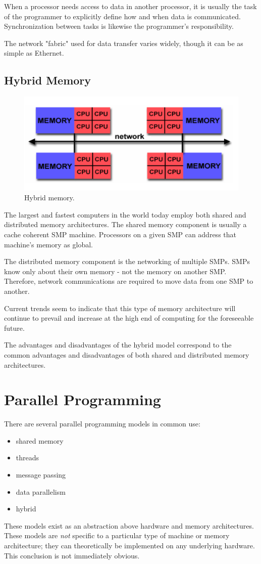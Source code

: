 When a processor needs access to data in another processor, it is usually the task of the programmer to explicitly define how and when data is communicated. Synchronization between tasks is likewise the programmer's responsibility.

The network "fabric" used for data transfer varies widely, though it can be as simple as Ethernet. 

\subsection{Hybrid Memory}
\label{ssec:hybrid}
\begin{figure}
\centering
\includegraphics[width=0.5\linewidth]{figures/screenshot055}
\caption{Hybrid memory.}
\label{fig:screenshot055}
\end{figure}

The  largest and fastest computers in the world today employ both shared and distributed memory architectures. The shared memory component is usually a cache coherent SMP machine. Processors on a given SMP can address that machine's memory as global. 

The distributed memory component is the networking of multiple SMPs. SMPs know only about their own memory - not the memory on another SMP. Therefore, network communications are required to move data from one SMP to another. 

Current trends seem to indicate that this type of memory architecture will continue to prevail and increase at the high end of computing for the foreseeable future. 

The advantages and disadvantages of the hybrid model correspond to the common advantages and disadvantages of both shared and distributed memory architectures.

\section{Parallel Programming}
There are several parallel programming models in common use: \begin{itemize}
\item shared memory
\item threads
\item message passing
\item data parallelism
\item hybrid
\end{itemize}
These models exist as an abstraction above hardware and memory architectures. These models are \textit{not} specific to a particular type of machine or memory architecture; they can theoretically be implemented on any underlying hardware. This conclusion is not immediately obvious.

